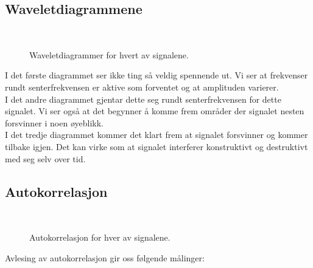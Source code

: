 \documentclass[12pt,norsk,a4paper]{article}
\begin{document}
\subsection{Waveletdiagrammene}

\begin{figure}[H]
\begin{center}
\\ 
\noindent 
{}
\end{center}
\caption[caption]{Waveletdiagrammer for hvert av signalene.} 
\end{figure}

I det første diagrammet ser ikke ting så veldig spennende ut. Vi ser at frekvenser rundt senterfrekvensen er aktive som forventet og at amplituden varierer.\\
I det andre diagrammet gjentar dette seg rundt senterfrekvensen for dette signalet. Vi ser også at det begynner å komme frem områder der signalet nesten forsvinner i noen øyeblikk.\\
I det tredje diagrammet kommer det klart frem at signalet forsvinner og kommer tilbake igjen. Det kan virke som at signalet interferer konstruktivt og destruktivt med seg selv over tid.

\subsection{Autokorrelasjon}

\begin{figure}[H]
\begin{center}
\\ 
\noindent 
{}
\end{center}
\caption[caption]{Autokorrelasjon for hver av signalene.}
\end{figure}
\newpage
\noindent
Avlesing av autokorrelasjon gir oss følgende målinger:\\
\end{document}
